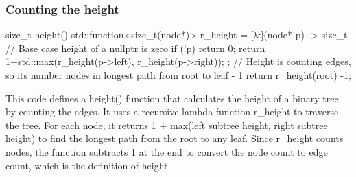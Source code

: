 \documentclass{report}
\begin{document}
    \pagebreak 
    \subsubsection{Counting the height}
    \bigbreak \noindent 
    \begin{cppcode}
        size_t height() {
            std::function<size_t(node*)> r_height = [&](node* p) -> size_t {
                // Base case height of a nullptr is zero
                if (!p) return 0;
                return 1+std::max(r_height(p->left), r_height(p->right));
            };
            // Height is counting edges, so its number nodes in longest path from root to leaf - 1
            return r_height(root) -1; 
        }
    \end{cppcode}
    \bigbreak \noindent 
    This code defines a height() function that calculates the height of a binary tree by counting the edges. It uses a recursive lambda function r\_height to traverse the tree. For each node, it returns 1 + max(left subtree height, right subtree height) to find the longest path from the root to any leaf. Since r\_height counts nodes, the function subtracts 1 at the end to convert the node count to edge count, which is the definition of height.

    \pagebreak 
\end{document}
